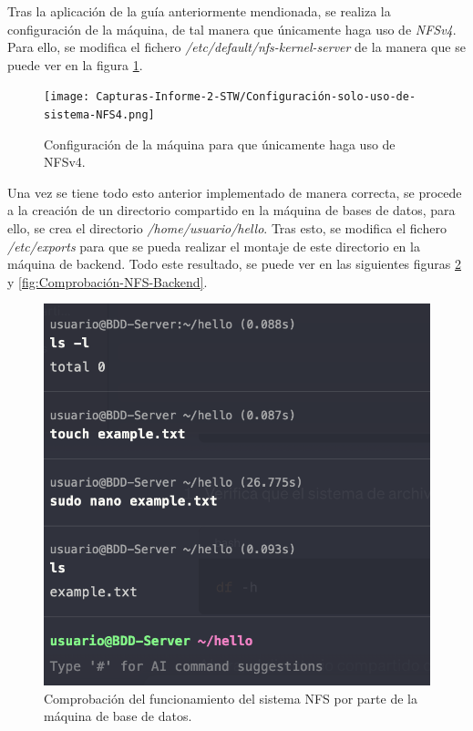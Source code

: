 \documentclass{report}
\begin{document}
  Tras la aplicación de la guía anteriormente mendionada, se realiza la configuración de la máquina, de tal manera que únicamente haga uso de \emph{NFSv4}. Para ello, se modifica el fichero \emph{/etc/default/nfs-kernel-server} de la manera que se puede ver en la figura \ref{fig:Configuración-NFSv4}.

  \begin{figure}[H]
    \centering
    \texttt{[image: Capturas-Informe-2-STW/Configuración-solo-uso-de-sistema-NFS4.png]}
    \caption{Configuración de la máquina para que únicamente haga uso de NFSv4.}
    \label{fig:Configuración-NFSv4}
  \end{figure}

  Una vez se tiene todo esto anterior implementado de manera correcta, se procede a la creación de un directorio compartido en la máquina de bases de datos, para ello, se crea el directorio \emph{/home/usuario/hello}. Tras esto, se modifica el fichero \emph{/etc/exports} para que se pueda realizar el montaje de este directorio en la máquina de backend. Todo este resultado, se puede ver en las siguientes figuras \ref{fig:Comprobación-NFS-BDD} y \ref{fig:Comprobación-NFS-Backend}.

  \begin{figure}[H]
    \centering
    \includegraphics[scale=0.6]{Capturas-Informe-2-STW/Funcionamiento-sistema-NFS-BDD.png}
    \caption{Comprobación del funcionamiento del sistema NFS por parte de la máquina de base de datos.}
    \label{fig:Comprobación-NFS-BDD}
  \end{figure}
\end{document}
